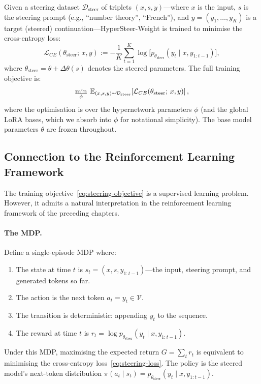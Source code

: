 Given a steering dataset $\mathcal{D}_{\mathrm{steer}}$ of triplets $(x, s, y)$---where $x$ is the input, $s$ is the steering prompt (e.g., ``number theory'', ``French''), and $y = (y_1,\ldots,y_K)$ is a target (steered) continuation---HyperSteer-Weight is trained to minimise the cross-entropy loss:
\begin{equation}\label{eq:steering-loss}
  \mathcal{L}_{CE}(\theta_{\mathrm{steer}};\, x, y) := -\frac{1}{K}\sum_{t=1}^K \log\bigl[p_{\theta_{\mathrm{steer}}}(y_t \mid x, y_{1:t-1})\bigr],
\end{equation}
where $\theta_{\mathrm{steer}} = \theta + \Delta\theta(s)$ denotes the steered parameters. The full training objective is:
\begin{equation}\label{eq:steering-objective}
  \min_\phi\; \mathbb{E}_{(x,s,y)\sim\mathcal{D}_{\mathrm{steer}}}\!\left[\mathcal{L}_{CE}(\theta_{\mathrm{steer}};\, x, y)\right],
\end{equation}
where the optimisation is over the hypernetwork parameters $\phi$ (and the global LoRA bases, which we absorb into $\phi$ for notational simplicity). The base model parameters $\theta$ are frozen throughout.

\subsection{Connection to the Reinforcement Learning Framework}
\label{subsec:rl-connection}

The training objective~\eqref{eq:steering-objective} is a supervised learning problem. However, it admits a natural interpretation in the reinforcement learning framework of the preceding chapters.

\paragraph{The MDP.} Define a single-episode MDP where:
\begin{enumerate}[label=(\roman*)]
  \item The state at time $t$ is $s_t = (x, s, y_{1:t-1})$---the input, steering prompt, and generated tokens so far.
  \item The action is the next token $a_t = y_t \in \mathcal{V}$.
  \item The transition is deterministic: appending $y_t$ to the sequence.
  \item The reward at time $t$ is $r_t = \log p_{\theta_{\mathrm{steer}}}(y_t \mid x, y_{1:t-1})$.
\end{enumerate}
Under this MDP, maximising the expected return $G = \sum_t r_t$ is equivalent to minimising the cross-entropy loss~\eqref{eq:steering-loss}. The policy is the steered model's next-token distribution $\pi(a_t \mid s_t) = p_{\theta_{\mathrm{steer}}}(y_t \mid x, y_{1:t-1})$.

